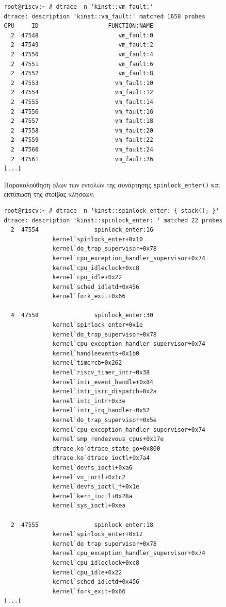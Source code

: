 \documentclass[12pt]{article}
\begin{document}
\begin{lstlisting}
root@riscv:~ # dtrace -n 'kinst::vm_fault:'
dtrace: description 'kinst::vm_fault:' matched 1658 probes
CPU     ID                    FUNCTION:NAME
  2  47548                       vm_fault:0
  2  47549                       vm_fault:2
  2  47550                       vm_fault:4
  2  47551                       vm_fault:6
  2  47552                       vm_fault:8
  2  47553                      vm_fault:10
  2  47554                      vm_fault:12
  2  47555                      vm_fault:14
  2  47556                      vm_fault:16
  2  47557                      vm_fault:18
  2  47558                      vm_fault:20
  2  47559                      vm_fault:22
  2  47560                      vm_fault:24
  2  47561                      vm_fault:26
[...]
\end{lstlisting}

Παρακολούθηση όλων των εντολών της συνάρτησης \lstinline{spinlock_enter()} και
εκτύπωση της στοίβας κλήσεων:

\begin{lstlisting}
root@riscv:~ # dtrace -n 'kinst::spinlock_enter: { stack(); }'
dtrace: description 'kinst::spinlock_enter: ' matched 22 probes
  2  47554                spinlock_enter:16
              kernel`spinlock_enter+0x10
              kernel`do_trap_supervisor+0x78
              kernel`cpu_exception_handler_supervisor+0x74
              kernel`cpu_idleclock+0xc8
              kernel`cpu_idle+0x22
              kernel`sched_idletd+0x456
              kernel`fork_exit+0x66

  4  47558                spinlock_enter:30
              kernel`spinlock_enter+0x1e
              kernel`do_trap_supervisor+0x78
              kernel`cpu_exception_handler_supervisor+0x74
              kernel`handleevents+0x1b0
              kernel`timercb+0x262
              kernel`riscv_timer_intr+0x38
              kernel`intr_event_handle+0x84
              kernel`intr_isrc_dispatch+0x2a
              kernel`intc_intr+0x3e
              kernel`intr_irq_handler+0x52
              kernel`do_trap_supervisor+0x5e
              kernel`cpu_exception_handler_supervisor+0x74
              kernel`smp_rendezvous_cpus+0x17e
              dtrace.ko`dtrace_state_go+0x800
              dtrace.ko`dtrace_ioctl+0x7a4
              kernel`devfs_ioctl+0xa6
              kernel`vn_ioctl+0x1c2
              kernel`devfs_ioctl_f+0x1e
              kernel`kern_ioctl+0x28a
              kernel`sys_ioctl+0xea

  2  47555                spinlock_enter:18
              kernel`spinlock_enter+0x12
              kernel`do_trap_supervisor+0x78
              kernel`cpu_exception_handler_supervisor+0x74
              kernel`cpu_idleclock+0xc8
              kernel`cpu_idle+0x22
              kernel`sched_idletd+0x456
              kernel`fork_exit+0x66
[...]
\end{lstlisting}
\end{document}
